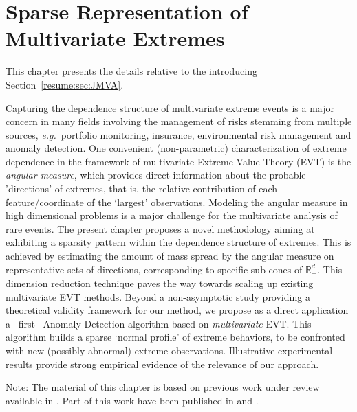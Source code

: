 \chapter{Sparse Representation of Multivariate Extremes}
\label{jmva}


\begin{chapabstract}
This chapter presents the details relative to the introducing Section~\ref{resume:sec:JMVA}.

Capturing the dependence structure of multivariate extreme events is
a major concern in many fields involving the management of risks
stemming from multiple sources, \emph{e.g.}~portfolio monitoring, insurance, environmental risk management and anomaly detection.
One convenient (non-parametric) characterization of  extreme dependence in the
framework of multivariate Extreme Value Theory (EVT) is the \textit{angular
  measure}, which provides direct information about the probable
'directions' of extremes, that is, the relative contribution of each
feature/coordinate of the `largest' observations. Modeling the
angular measure in high dimensional problems is a major challenge for
the multivariate analysis of rare events.
The present chapter proposes a novel methodology aiming at 
exhibiting a sparsity pattern within the dependence structure of extremes. 
This is achieved by estimating the amount of mass spread by the angular measure on
representative sets of directions, corresponding to  specific sub-cones of $\mathbb{R}_+^d$.
This dimension reduction technique  paves the way towards scaling up existing multivariate EVT methods.
Beyond a non-asymptotic study providing a theoretical validity
framework for our method, we propose  as a direct application a --first--
Anomaly Detection algorithm based on \textit{multivariate} EVT.  This algorithm builds a sparse `normal profile' of extreme behaviors, to be confronted with new (possibly abnormal) extreme observations. Illustrative experimental results provide strong empirical evidence of the relevance of our approach.
\end{chapabstract}

Note: The material of this chapter is based on previous work under review available in \cite{ARXIV16}. Part of this work have been published in \cite{AISTAT15} and \cite{NIPSWORKSHOP15}.



